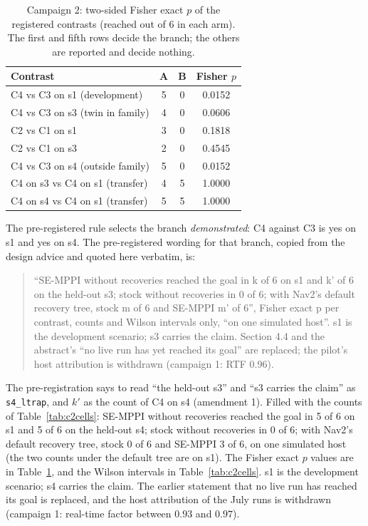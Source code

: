 \documentclass[journal]{IEEEtran}
\begin{document}
\begin{table}[t]
\centering
\caption{Campaign 2: two-sided Fisher exact $p$ of the registered contrasts (reached out of 6
in each arm). The first and fifth rows decide the branch; the others are reported and decide
nothing.}
\label{tab:c2contrasts}
\footnotesize
\setlength{\tabcolsep}{3pt}
\begin{tabular}{lccc}
\toprule
Contrast & A & B & Fisher $p$ \\
\midrule
C4 vs C3 on s1 (development) & 5 & 0 & 0.0152 \\
C4 vs C3 on s3 (twin in family) & 4 & 0 & 0.0606 \\
C2 vs C1 on s1 & 3 & 0 & 0.1818 \\
C2 vs C1 on s3 & 2 & 0 & 0.4545 \\
C4 vs C3 on s4 (outside family) & 5 & 0 & 0.0152 \\
C4 on s3 vs C4 on s1 (transfer) & 4 & 5 & 1.0000 \\
C4 on s4 vs C4 on s1 (transfer) & 5 & 5 & 1.0000 \\
\bottomrule
\end{tabular}
\end{table}

The pre-registered rule selects the branch \emph{demonstrated}: C4 against C3 is yes on s1 and yes on
s4. The pre-registered wording for that branch, copied from the design advice and
quoted here verbatim, is:

\begin{quote}\small
``SE-MPPI without recoveries reached the goal in k of 6 on s1 and k' of 6 on the held-out s3;
stock without recoveries in 0 of 6; with Nav2's default recovery tree, stock m of 6 and SE-MPPI m' of 6'',
Fisher exact p per contrast, counts and Wilson intervals only, ``on one simulated host''. s1 is the
development scenario; s3 carries the claim. Section 4.4 and the abstract's ``no live run has yet
reached its goal'' are replaced; the pilot's host attribution is withdrawn (campaign 1: RTF 0.96).
\end{quote}

The pre-registration says to read ``the held-out s3'' and ``s3 carries the claim'' as
\texttt{s4\_ltrap}, and $k'$ as the count of C4 on s4 (amendment 1). Filled with the counts
of Table~\ref{tab:c2cells}: SE-MPPI without recoveries reached the goal in 5 of 6 on s1 and 5 of 6 on the
held-out s4; stock without recoveries in 0 of 6; with Nav2's default recovery tree, stock 0 of 6 and
SE-MPPI 3 of 6, on one simulated host (the two counts under the default tree are on s1). The Fisher exact $p$ values are in Table~\ref{tab:c2contrasts},
and the Wilson intervals in Table~\ref{tab:c2cells}. s1 is the development scenario; s4 carries the claim.
The earlier statement that no live run has reached its goal is replaced, and the host attribution of the
July runs is withdrawn (campaign 1: real-time factor between $0.93$ and $0.97$).
\end{document}

